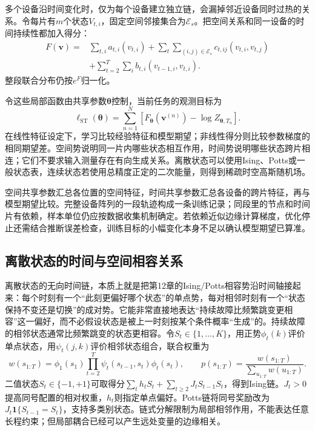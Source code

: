 \label{sec:pgm-dynamic-undirected-spatiotemporal}
多个设备沿时间变化时，仅为每个设备建立独立链，会漏掉邻近设备同时过热的关系。令每片有$m$个状态$V_{t,i}$，固定空间邻接集合为$\mathcal E_s$。把空间关系和同一设备的时间持续性都加入得分：
\begin{equation}
  \begin{aligned}
    F(\bm v)= {}&\sum_{t,i}a_{t,i}(v_{t,i})
       +\sum_t\sum_{(i,j)\in\mathcal E_s}
                      c_{t,ij}(v_{t,i},v_{t,j})\\
       &+\sum_{t=2}^T\sum_i b_{t,i}(v_{t-1,i},v_{t,i}).
  \end{aligned}
  \label{eq:pgm-dynamic-undirected-spatiotemporal}
\end{equation}
整段联合分布仍按$e^F$归一化。

令这些局部函数由共享参数$\bm\theta$控制，当前任务的观测目标为
\begin{equation}
  \ell_{\mathrm{ST}}(\bm\theta)
     =\sum_{n=1}^{N}[F_{\bm\theta}(\bm v^{(n)})
                       -\log Z_{\bm\theta,T_n}].
  \label{eq:pgm-dynamic-undirected-spatiotemporal-objective}
\end{equation}
在线性特征设定下，学习比较经验特征和模型期望；非线性得分则比较参数梯度的相同期望差。空间势说明同一片内哪些状态相互作用，时间势说明哪些状态跨片相连；它们不要求输入测量存在有向生成关系。离散状态可以使用Ising、Potts或一般状态表，连续状态若使用总精度正定的二次能量，则得到稀疏时空高斯随机场。

空间共享参数汇总各位置的空间特征，时间共享参数汇总各设备的跨片特征，再与模型期望比较。完整设备阵列的一段轨迹构成一条训练记录；同段里的节点和时间片有依赖，样本单位仍应按数据收集机制确定。若依赖近似边缘计算梯度，优化停止还需结合推断误差检查，训练目标的小幅变化本身不足以确认模型期望已算准。

\subsection{离散状态的时间与空间相容关系}
\label{sec:pgm-dynamic-undirected-discrete-chain}

离散状态的无向时间链，本质上就是把第12章的Ising/Potts相容势沿时间轴接起来：每个时刻有一个“此刻更偏好哪个状态”的单点势，每对相邻时刻有一个“状态保持不变还是切换”的成对势。它能非常直接地表达“持续故障比频繁跳变更相容”这一偏好，而不必假设状态是被上一时刻按某个条件概率“生成”的。持续故障的相邻状态通常比频繁跳变的状态更相容。令$S_t\in\{1,\ldots,K\}$，用正势$\phi_t(k)$评价单点状态，用$\psi_t(j,k)$评价相邻状态组合，联合权重为
\begin{equation}
  w(s_{1:T})=\phi_1(s_1)
             \prod_{t=2}^T\psi_t(s_{t-1},s_t)\phi_t(s_t),
  \qquad p(s_{1:T})=\frac{w(s_{1:T})}{\sum_{u_{1:T}}w(u_{1:T})}.
  \label{eq:pgm-dynamic-undirected-chain-weight}
\end{equation}
二值状态$S_t\in\{-1,+1\}$可取得分$\sum_t h_tS_t+\sum_{t\ge2}J_tS_{t-1}S_t$，得到Ising链。$J_t>0$提高同号配置的相对权重，$h_t$则指定单点偏好。Potts链将同号奖励改为$J_t\mathbf1\{S_{t-1}=S_t\}$，支持多类别状态。链式分解限制为局部相邻作用，不能表达任意长程约束；但局部耦合已经可以产生远处变量的边缘相关。

